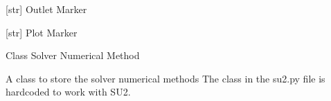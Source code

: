 \documentclass[letterpaper,10pt,english]{sphinxmanual}
\begin{document}
\begin{fulllineitems}
\begin{fulllineitems}
\end{fulllineitems}


\begin{fulllineitems}
\label{\detokenize{modules:su2.Solver_BC.outlet}}
\pysigstartsignatures
{}
\pysigstopsignatures
\sphinxAtStartPar
{[}str{]} Outlet Marker

\end{fulllineitems}


\begin{fulllineitems}
\label{\detokenize{modules:su2.Solver_BC.plot}}
\pysigstartsignatures
{}
\pysigstopsignatures
\sphinxAtStartPar
{[}str{]} Plot Marker

\end{fulllineitems}


\end{fulllineitems}


\begin{fulllineitems}
\label{\detokenize{modules:su2.Solver_Numerical_Method}}
\pysigstartsignatures
{}
\pysigstopsignatures
\sphinxAtStartPar
Class Solver Numerical Method

\sphinxAtStartPar
A class to store the solver numerical methods
The class in the su2.py file is hardcoded to work with SU2.

\end{fulllineitems}

\end{document}
